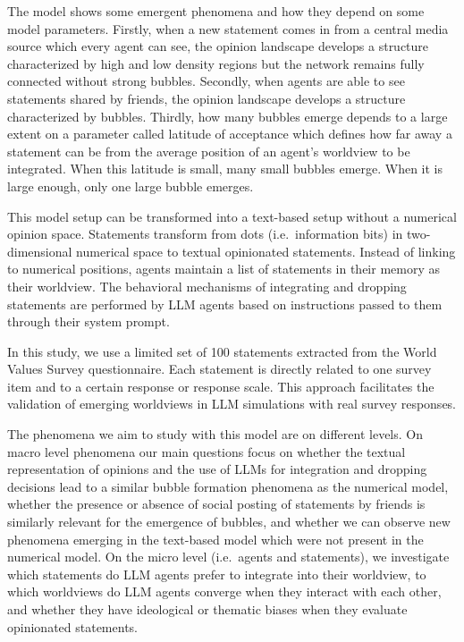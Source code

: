 \documentclass[]{ceurart}
\begin{document}
The model shows some emergent phenomena and how they depend on some
model parameters. Firstly, when a new statement comes in from a central
media source which every agent can see, the opinion landscape develops a
structure characterized by high and low density regions but the network
remains fully connected without strong bubbles. Secondly, when agents
are able to see statements shared by friends, the opinion landscape
develops a structure characterized by bubbles. Thirdly, how many bubbles
emerge depends to a large extent on a parameter called latitude of
acceptance which defines how far away a statement can be from the
average position of an agent's worldview to be integrated. When this
latitude is small, many small bubbles emerge. When it is large enough,
only one large bubble emerges.

This model setup can be transformed into a text-based setup without a
numerical opinion space. Statements transform from dots
(i.e.~information bits) in two-dimensional numerical space to textual
opinionated statements. Instead of linking to numerical positions,
agents maintain a list of statements in their memory as their worldview.
The behavioral mechanisms of integrating and dropping statements are
performed by LLM agents based on instructions passed to them through
their system prompt.

In this study, we use a limited set of 100 statements extracted from the
World Values Survey questionnaire. Each statement is directly related to
one survey item and to a certain response or response scale. This
approach facilitates the validation of emerging worldviews in LLM
simulations with real survey responses.

The phenomena we aim to study with this model are on different levels.
On macro level phenomena our main questions focus on whether the textual
representation of opinions and the use of LLMs for integration and
dropping decisions lead to a similar bubble formation phenomena as the
numerical model, whether the presence or absence of social posting of
statements by friends is similarly relevant for the emergence of
bubbles, and whether we can observe new phenomena emerging in the
text-based model which were not present in the numerical model. On the
micro level (i.e.~agents and statements), we investigate which
statements do LLM agents prefer to integrate into their worldview, to
which worldviews do LLM agents converge when they interact with each
other, and whether they have ideological or thematic biases when they
evaluate opinionated statements.
\end{document}
